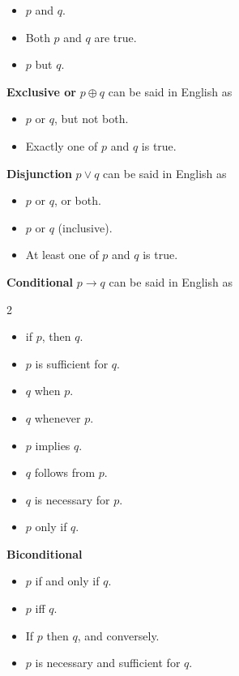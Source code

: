 \documentclass[12pt, oneside]{article}
\begin{document}
\vspace{-20pt}
\begin{itemize}
    \item $p$ and $q$.
    \item Both $p$ and $q$ are true.
    \item $p$ but $q$.
\end{itemize}

{\bf Exclusive or} $p \oplus q$ can be said in English as

\vspace{-20pt}
\begin{itemize}
    \item $p$ or $q$, but not both.
    \item Exactly one of $p$ and $q$ is true.
\end{itemize}

{\bf Disjunction} $p \lor q$ can be said in English as

\vspace{-20pt}
\begin{itemize}
    \item $p$ or $q$, or both.
    \item $p$ or $q$ (inclusive).
    \item At least one of $p$ and $q$ is true.
\end{itemize}

{\bf Conditional} $p \to q$ can be said in English as

\begin{multicols}{2}
\begin{itemize}
    \item if $p$, then $q$.
    \item $p$ is sufficient for $q$.
    \item $q$ when $p$.
    \item $q$ whenever $p$.
    \item $p$ implies $q$.
    \item $q$ follows from $p$.
    \item $q$ is necessary for $p$.
    \item $p$ only if $q$.
\end{itemize}
\end{multicols}

{\bf Biconditional}

\vspace{-20pt}
\begin{itemize}
    \item $p$ if and only if $q$.
    \item $p$ iff $q$.
    \item If $p$ then $q$, and conversely.
    \item $p$ is necessary and sufficient for $q$.
\end{itemize} \newpage
\end{document}
